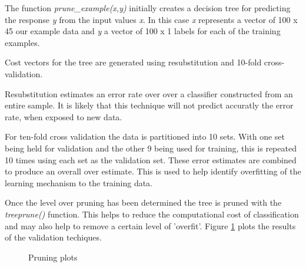 The function \emph{prune\_example(x,y)} initially creates a decision tree for predicting the response \emph{y} from the input
values \emph{x}. In this case \emph{x} represents a vector of 100 x 45 our
example data and \emph{y} a vector of 100 x 1 labels for each of the training
examples.

Cost vectors for the tree are generated using resubstitution and 10-fold
cross-validation.

Resubstitution estimates an error rate over over a classifier constructed from
an entire sample. It is likely that this technique will not predict accuratly
the error rate, when exposed to new data.

For ten-fold cross validation the data is partitioned into 10 sets. With one
set being held for validation and the other 9 being used for training, this is
repeated 10 times using each set as the validation set. These error estimates are
combined to produce an overall over estimate. This is used to help identify
overfitting of the learning mechanism to the training data.

Once the level over pruning has been determined the tree is pruned with the
\emph{treeprune()} function. This helps to reduce the computational cost of
classification and may also help to remove a certain level of 'overfit'. Figure \ref{fig:pruning} plots the results of the validation techiques.

\begin{figure}[h]
    \centering
    \caption{Pruning plots}
    \label{fig:pruning}
\end{figure}
